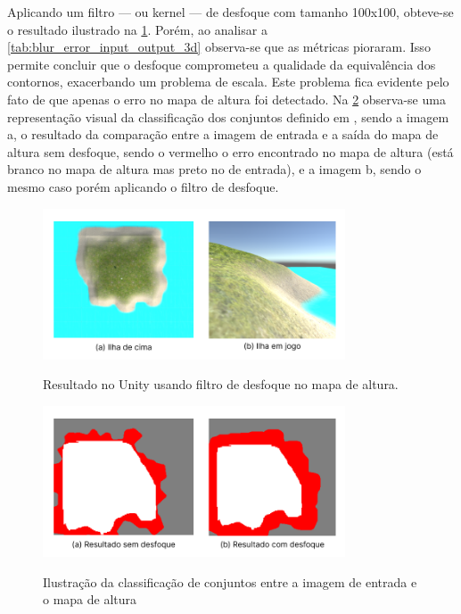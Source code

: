 Aplicando um filtro — ou kernel — de desfoque com tamanho 100x100, obteve-se o resultado ilustrado na \cref{fig:Unity_blur}. Porém, ao analisar a \cref{tab:blur_error_input_output_3d} observa-se que as métricas pioraram. Isso permite concluir que o desfoque comprometeu a qualidade da equivalência dos contornos, exacerbando um problema de escala. Este problema fica evidente pelo fato de que apenas o erro no mapa de altura foi detectado. Na \cref{fig:comparando_blur} observa-se uma representação visual da classificação dos conjuntos definido em , sendo a imagem a, o resultado da comparação entre a imagem de entrada e a saída do mapa de altura sem desfoque, sendo o vermelho o erro encontrado no mapa de altura (está branco no mapa de altura mas preto no de entrada), e a imagem b, sendo o mesmo caso porém aplicando o filtro de desfoque.

\begin{figure}[!ht]
	\centering
    \caption{Resultado no Unity usando filtro de desfoque no mapa de altura.}
	\includegraphics[width=0.8\textwidth]{figures/Unity_blur.png}
	\label{fig:Unity_blur}
\end{figure}



\begin{figure}[!ht]
	\centering
    \caption{Ilustração da classificação de conjuntos entre a imagem de entrada e o mapa de altura}
	\includegraphics[width=0.8\textwidth]{figures/comparacao_blur.png}
	\label{fig:comparando_blur}
\end{figure}


